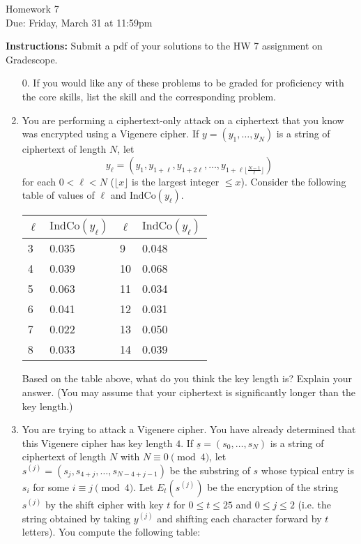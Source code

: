 \documentclass[12pt]{article}
\begin{document}
\begin{center}
{\Large Homework 7}\\
Due: Friday,  March 31 at 11:59pm\\


\end{center}
{\bf Instructions:} Submit a pdf of your solutions to the HW 7 assignment on Gradescope.  



\begin{enumerate}
\item[0.] If you would like any of these problems to be graded for proficiency with the core skills, list the skill and the corresponding problem. 


\item  You are performing a ciphertext-only attack on a ciphertext that you know was encrypted using a Vigenere cipher.  If $y = (y_1, \ldots, y_{N})$ is a string of ciphertext of length $N$, let $$y_{\ell} = (y_1, y_{1+\ell}, y_{1+2\ell}, \ldots, y_{1+\ell\lfloor{\frac{N-1}{\ell}}\rfloor})$$ for each $0 < \ell <N$ ($\lfloor x \rfloor$ is the largest integer $\le x$).  Consider the following table of values of $\ell$ and $\mathrm{IndCo}(y_{\ell})$.

\begin{center}
    \begin{tabular}{ l | l | l | l }
    $\ell$ & $\mathrm{IndCo}(y_\ell)$ &  $\ell$ & $\mathrm{IndCo}(y_\ell)$  \\ 
    \hline
    3 & 0.035 & 9  & 0.048\\ 
    4 & 0.039 & 10 & 0.068  \\ 
    5 & 0.063 & 11 & 0.034  \\
    6 & 0.041  & 12 & 0.031  \\
    7 & 0.022  &  13 & 0.050\\
    8 & 0.033  &  14 & 0.039\\
    \end{tabular}
\end{center}

Based on the table above, what do you think the key length is?  Explain your answer. (You may assume that your ciphertext is significantly longer than the key length.)

\item   You are trying to attack a Vigenere cipher.  You have already determined that this Vigenere cipher has key length $4$.  If $\underline{s} = (s_0, \ldots, s_{N})$ is a string of ciphertext of length $N$ with $N \equiv 0 \pmod4$, let $s^{(j)} = (s_j,s_{4+j},\ldots,s_{N-4+j-1})$ be the substring of $s$ whose typical entry is $s_i$ for some $i \equiv j \pmod 4$.  Let $E_t(s^{(j)})$ be the encryption of the string $s^{(j)}$ by the shift cipher with key $t$ for $0 \leq t \leq 25$ and $0 \leq j \leq 2$ (i.e. the string obtained by taking $y^{(j)}$ and shifting each character forward by $t$ letters).  You compute the following table:


\end{enumerate}
\end{document}
